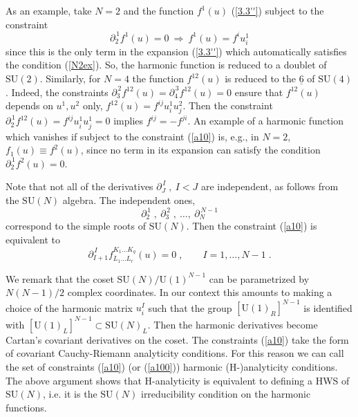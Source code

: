 \documentclass[a4paper,12pt]{article}
\begin{document}
As an example, take $N=2$ and the function $f^1(u)$ (\ref{3.3''}) 
subject to the constraint 
\begin{equation}\label{N2ex}
  \partial^{\,1}_2f^1(u) = 0 \ \Rightarrow \ f^1(u) = f^i u^1_i
\end{equation}
since this is the only term in the expansion (\ref{3.3''}) which 
automatically satisfies the condition (\ref{N2ex}). So, the 
harmonic function is reduced to a doublet of $\mbox{SU}(2)$. 
Similarly, for $N=4$ the function $f^{12}(u)$ is reduced to the 
$\underline 6$ of $\mbox{SU}(4)$. Indeed, the constraints 
$\partial^{\,2}_3 f^{12}(u) = 
\partial^{\,3}_4 f^{12}(u) = 0$ ensure that $f^{12}(u)$ depends on 
$u^1,u^2$ only, $f^{12}(u)= f^{ij}u^1_iu^2_j$. Then the constraint 
$\partial^{\,1}_2 f^{12}(u) =f^{ij}u^1_iu^1_j = 0$ implies $f^{ij} 
= -f^{ji}$. An example of a harmonic function which vanishes if 
subject to the constraint (\ref{a10}) is, e.g., in $N=2$, 
$f_1(u)\equiv f^2(u)$, since no term in its expansion can satisfy 
the condition $\partial^{\,1}_2f^2(u) = 0$.  

Note that not all of the derivatives $\partial^{\,I}_J \;, \ I<J$ 
are independent, as follows from the $\mbox{SU}(N)$ algebra. The 
independent ones,
\begin{equation}\label{rankder}
  \partial^{\,1}_2\;,\ \partial^{\,2}_3\;,\ \ldots,\ \partial^{\,N-1}_N 
\end{equation}
correspond to the simple roots of $\mbox{SU}(N)$. Then the 
constraint (\ref{a10}) is equivalent to 
\begin{equation}\label{a100}
\partial^{\,I}_{I+1} f^{K_1\ldots K_q}_{L_1\ldots L_r}(u) = 0\;, 
\qquad I=1,\ldots, N-1\;. 
\end{equation}

We remark that the coset $\mbox{SU}(N)/\mbox{U}(1)^{N-1}$ can be 
parametrized by $N(N-1)/2$ complex coordinates. In our context 
this amounts to making a choice of the harmonic matrix $u^I_i$ 
such that the group $[\mbox{U}(1)_R]^{N-1}$ is identified with 
$[\mbox{U}(1)_L]^{N-1}\subset \mbox{SU}(N)_L$. Then the harmonic 
derivatives become Cartan's covariant derivatives on the coset. 
The constraints (\ref{a10}) take the form of covariant 
Cauchy-Riemann analyticity conditions. For this reason we can call 
the set of constraints (\ref{a10}) (or (\ref{a100})) harmonic 
(H-)analyticity conditions. The above argument shows that 
H-analyticity is equivalent to defining a HWS of $\mbox{SU}(N)$, 
i.e. it is the $\mbox{SU}(N)$ irreducibility condition on the 
harmonic functions. 
\end{document}
